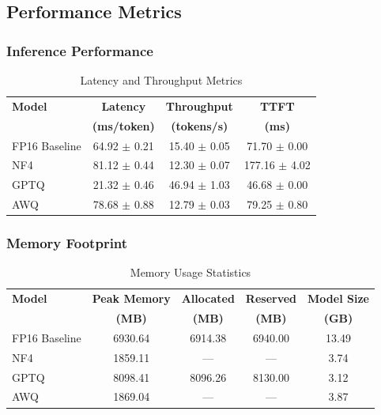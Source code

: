 \newpage
\subsection{Performance Metrics}

\subsubsection{Inference Performance}

\begin{table}[h]
\centering
\caption{Latency and Throughput Metrics}
\label{tab:performance}
\begin{tabular}{@{}lccc@{}}
\toprule
\textbf{Model} & \textbf{Latency} & \textbf{Throughput} & \textbf{TTFT} \\
 & \textbf{(ms/token)} & \textbf{(tokens/s)} & \textbf{(ms)} \\
\midrule
FP16 Baseline & 64.92 $\pm$ 0.21 & 15.40 $\pm$ 0.05 & 71.70 $\pm$ 0.00 \\
NF4 & 81.12 $\pm$ 0.44 & 12.30 $\pm$ 0.07 & 177.16 $\pm$ 4.02 \\
GPTQ & 21.32 $\pm$ 0.46 & 46.94 $\pm$ 1.03 & 46.68 $\pm$ 0.00 \\
AWQ & 78.68 $\pm$ 0.88 & 12.79 $\pm$ 0.03 & 79.25 $\pm$ 0.80 \\
\bottomrule
\end{tabular}
\end{table}

\subsubsection{Memory Footprint}

\begin{table}[h]
\centering
\caption{Memory Usage Statistics}
\label{tab:memory}
\begin{tabular}{@{}lcccc@{}}
\toprule
\textbf{Model} & \textbf{Peak Memory} & \textbf{Allocated} & \textbf{Reserved} & \textbf{Model Size} \\
 & \textbf{(MB)} & \textbf{(MB)} & \textbf{(MB)} & \textbf{(GB)} \\
\midrule
FP16 Baseline & 6930.64 & 6914.38 & 6940.00 & 13.49 \\
NF4 & 1859.11 & --- & --- & 3.74 \\
GPTQ & 8098.41 & 8096.26 & 8130.00 & 3.12 \\
AWQ & 1869.04 & --- & --- & 3.87 \\
\bottomrule
\end{tabular}
\end{table}



